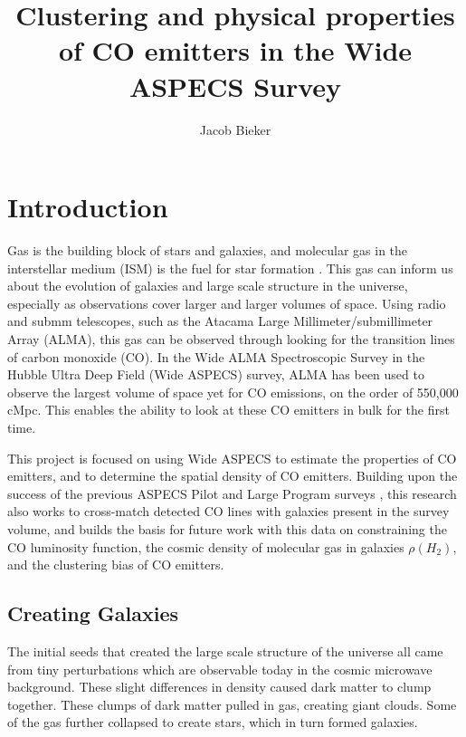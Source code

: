 \documentclass[twoside,single]{lion-msc}
\title{Clustering and physical properties of CO emitters in the Wide ASPECS Survey}
\author{Jacob Bieker}
\affiliation{Leiden Observatory, Leiden University}
\begin{document}
\maketitle

\setcounter{page}{2}
\tableofcontents
\cleardoublepage

\setcounter{page}{1}
\chapter{Introduction}

Gas is the building block of stars and galaxies, and molecular gas in the interstellar medium (ISM) is the fuel for star formation \cite{decarli2019alma}. This gas can inform us about the evolution of galaxies and large scale structure in the universe, especially as observations cover larger and larger volumes of space. Using radio and submm telescopes, such as the Atacama Large Millimeter/submillimeter Array (ALMA), this gas can be observed through looking for the transition lines of carbon monoxide (CO). In the Wide ALMA Spectroscopic Survey in the Hubble Ultra Deep Field (Wide ASPECS) survey, ALMA has been used to observe the largest volume of space yet for CO emissions, on the order of 550,000 cMpc. This enables the ability to look at these CO emitters in bulk for the first time.

This project is focused on using Wide ASPECS to estimate the properties of CO emitters, and to determine the spatial density of CO emitters. Building upon the success of the previous ASPECS Pilot and Large Program surveys \cite{walter2016alma, decarli2019alma}, this research also works to cross-match detected CO lines with galaxies present in the survey volume, and builds the basis for future work with this data on constraining the CO luminosity function, the cosmic density of molecular gas in galaxies $\rho(H_2)$, and the clustering bias of CO emitters.

\section{Creating Galaxies}

The initial seeds that created the large scale structure of the universe all came from tiny perturbations which are observable today in the cosmic microwave background. These slight differences in density caused dark matter to clump together. These clumps of dark matter pulled in gas, creating giant clouds. Some of the gas further collapsed to create stars, which in turn formed galaxies.
\end{document}
